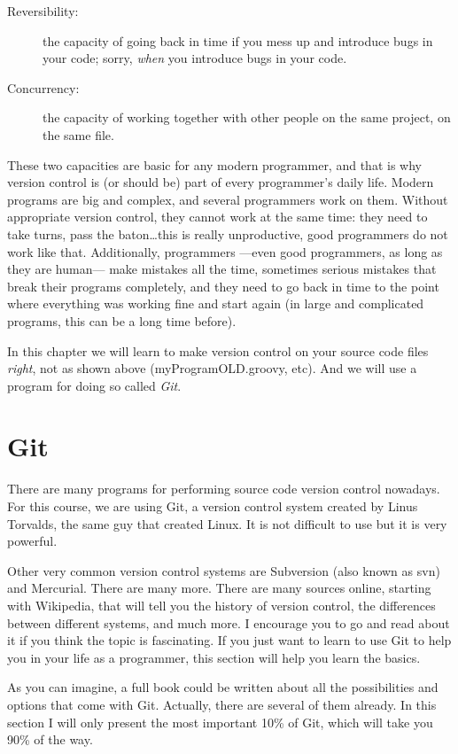 \begin{description}
\item[Reversibility: ] the capacity of going back in time if you mess
  up and introduce bugs in your code; sorry, \emph{when} you introduce
  bugs in your code.
\item[Concurrency: ] the capacity of working together with other
  people on the same project, on the same file. 
\end{description}

These two capacities are basic for any modern programmer, and that is
why version control is (or should be) part of every programmer's daily
life. Modern programs are big and complex, and several programmers
work on them. Without appropriate version control, they cannot work at
the same time: they need to take turns, pass the baton\ldots this is
really unproductive, good programmers do not work like
that. Additionally, programmers ---even good programmers, as long as
they are human--- make mistakes all the time, sometimes serious
mistakes that break their programs completely, and they need to go
back in time to the point where everything was working fine and start
again (in large and complicated programs, this can be a long time
before).

In this chapter we will learn to make version control on your source
code files \emph{right}, not as shown above (myProgramOLD.groovy,
etc). And we will use a program for doing so called \emph{Git}.

\section{Git}
\label{sec:git}

There are many programs for performing source code version control
nowadays. For this course, we are using Git, a version control system
created by Linus Torvalds, the same guy that created Linux. It is not
difficult to use but it is very powerful. 

Other very common version control systems are Subversion (also known
as svn) and Mercurial. There are many more. There are many sources
online, starting with Wikipedia, that will tell you the history of
version control, the differences between different systems, and much
more. I encourage you to go and read about it if you think the topic
is fascinating. If you just want to learn to use Git to help you in
your life as a programmer, this section will help you learn the
basics. 

As you can imagine, a full book could be written about all the
possibilities and options that come with Git. Actually, there are
several of them already. In this section I will only present the most
important 10\% of Git, which will take you 90\% of the way. 

